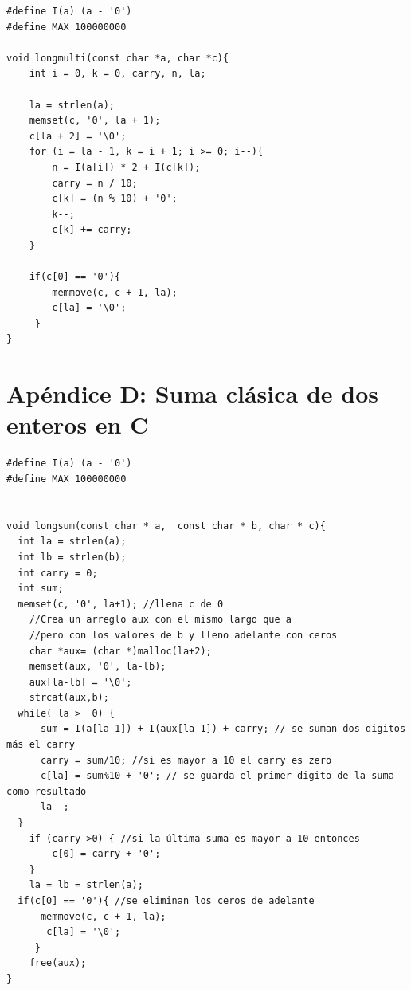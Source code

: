 \documentclass[10pt,journal,compsoc]{IEEEtran}
\begin{document}
\begin{verbatim}
#define I(a) (a - '0')
#define MAX 100000000

void longmulti(const char *a, char *c){
	int i = 0, k = 0, carry, n, la;

	la = strlen(a);
	memset(c, '0', la + 1);
	c[la + 2] = '\0';
	for (i = la - 1, k = i + 1; i >= 0; i--){
		n = I(a[i]) * 2 + I(c[k]);
		carry = n / 10;
		c[k] = (n % 10) + '0';
		k--;
		c[k] += carry;
	}

	if(c[0] == '0'){
		memmove(c, c + 1, la);
		c[la] = '\0';
     }
}
\end{verbatim}

\section*{Apéndice D: Suma clásica de dos enteros en C}

\begin{verbatim}
#define I(a) (a - '0')
#define MAX 100000000


void longsum(const char * a,  const char * b, char * c){
  int la = strlen(a);
  int lb = strlen(b);
  int carry = 0;
  int sum;
  memset(c, '0', la+1); //llena c de 0
	//Crea un arreglo aux con el mismo largo que a
    //pero con los valores de b y lleno adelante con ceros
	char *aux= (char *)malloc(la+2);
	memset(aux, '0', la-lb);
    aux[la-lb] = '\0';
	strcat(aux,b);
  while( la >  0) {
      sum = I(a[la-1]) + I(aux[la-1]) + carry; // se suman dos digitos más el carry
      carry = sum/10; //si es mayor a 10 el carry es zero
      c[la] = sum%10 + '0'; // se guarda el primer digito de la suma como resultado
      la--;
  }
	if (carry >0) { //si la última suma es mayor a 10 entonces
		c[0] = carry + '0';
	}
	la = lb = strlen(a);
  if(c[0] == '0'){ //se eliminan los ceros de adelante
      memmove(c, c + 1, la);
       c[la] = '\0';
     }
    free(aux);
}
\end{verbatim}
\end{document}
